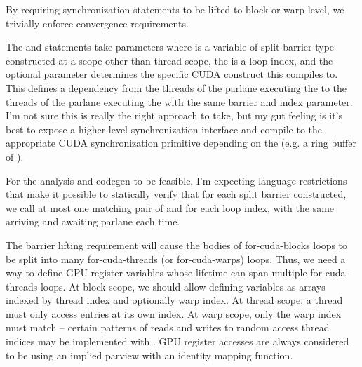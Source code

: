 By requiring synchronization statements to be lifted to block or warp level, we trivially enforce convergence requirements.

\filbreak
The  and  statements take parameters  where  is a variable of split-barrier type constructed at a scope other than thread-scope, the  is a loop index, and the optional  parameter determines the specific CUDA construct this compiles to.
This defines a dependency from the threads of the parlane executing the  to the threads of the parlane executing the  with the same barrier and index parameter.
I'm not sure this is really the right approach to take, but my gut feeling is it's best to expose a higher-level synchronization interface and compile to the appropriate CUDA synchronization primitive depending on the  (e.g. a ring buffer of \mbarrier).

\filbreak
{} For the analysis and codegen to be feasible, I'm expecting language restrictions that make it possible to statically verify that for each split barrier constructed, we call at most one matching pair of  and  for each loop index, with the same arriving and awaiting parlane each time.

\filbreak
{} The barrier lifting requirement will cause the bodies of for-cuda-blocks loops to be split into many for-cuda-threads (or for-cuda-warps) loops.
Thus, we need a way to define GPU register variables whose lifetime can span multiple for-cuda-threads loops.
At block scope, we should allow defining  variables as arrays indexed by thread index and optionally warp index.
At thread scope, a thread must only access entries at its own index.
At warp scope, only the warp index must match -- certain patterns of reads and writes to random access thread indices may be implemented with .
GPU register accesses are always considered to be using an implied parview with an identity mapping function.

\filbreak
{}


\filbreak
{}

\filbreak
{} %


